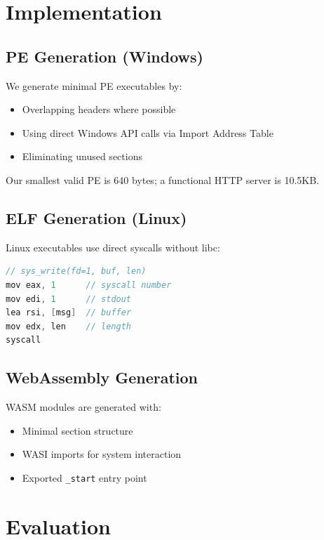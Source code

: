 \documentclass[11pt,a4paper]{article}
\begin{document}
\section{Implementation}

\subsection{PE Generation (Windows)}

We generate minimal PE executables by:
\begin{itemize}
    \item Overlapping headers where possible
    \item Using direct Windows API calls via Import Address Table
    \item Eliminating unused sections
\end{itemize}

Our smallest valid PE is 640 bytes; a functional HTTP server is 10.5KB.

\subsection{ELF Generation (Linux)}

Linux executables use direct syscalls without libc:

\begin{lstlisting}[language=C,caption=Linux syscall emission]
// sys_write(fd=1, buf, len)
mov eax, 1      // syscall number
mov edi, 1      // stdout
lea rsi, [msg]  // buffer
mov edx, len    // length
syscall
\end{lstlisting}

\subsection{WebAssembly Generation}

WASM modules are generated with:
\begin{itemize}
    \item Minimal section structure
    \item WASI imports for system interaction
    \item Exported \texttt{\_start} entry point
\end{itemize}

\section{Evaluation}
\end{document}
